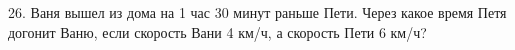 26. Ваня вышел из дома на 1 час 30 минут раньше Пети. Через какое время Петя догонит Ваню, если скорость Вани 4 км/ч, а скорость Пети 6 км/ч?\\
